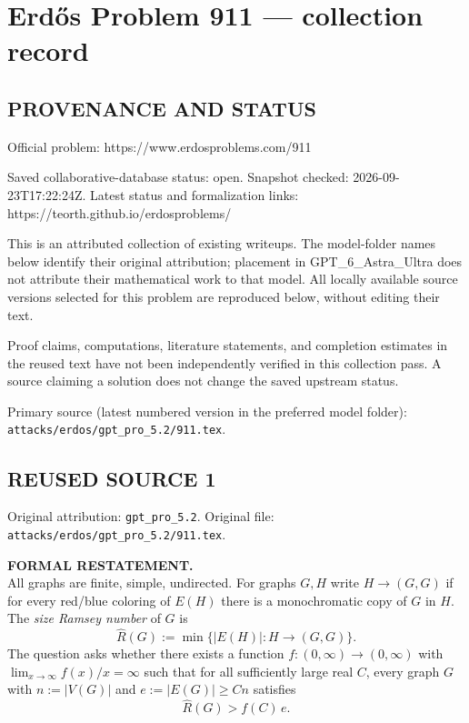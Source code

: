\section*{Erd\H{o}s Problem 911 --- collection record}

\subsection*{PROVENANCE AND STATUS}
Official problem: https://www.erdosproblems.com/911

Saved collaborative-database status: open.
Snapshot checked: 2026-09-23T17:22:24Z.
Latest status and formalization links: https://teorth.github.io/erdosproblems/

This is an attributed collection of existing writeups. The model-folder names below identify their original attribution; placement in GPT\_6\_Astra\_Ultra does not attribute their mathematical work to that model. All locally available source versions selected for this problem are reproduced below, without editing their text.

Proof claims, computations, literature statements, and completion estimates in the reused text have not been independently verified in this collection pass. A source claiming a solution does not change the saved upstream status.

Primary source (latest numbered version in the preferred model folder): \texttt{attacks/erdos/gpt\_pro\_5.2/911.tex}.

\subsection*{REUSED SOURCE 1}
Original attribution: \texttt{gpt\_pro\_5.2}.
Original file: \texttt{attacks/erdos/gpt\_pro\_5.2/911.tex}.


\noindent\textbf{FORMAL RESTATEMENT.}\\
All graphs are finite, simple, undirected. For graphs $G,H$ write $H\to (G,G)$ if for every red/blue coloring of $E(H)$ there is a monochromatic copy of $G$ in $H$. The \emph{size Ramsey number} of $G$ is
\[
\hat R(G):=\min\{|E(H)|: H\to (G,G)\}.
\]
The question asks whether there exists a function $f:(0,\infty)\to (0,\infty)$ with $\lim_{x\to\infty} f(x)/x=\infty$ such that for all sufficiently large real $C$, every graph $G$ with $n:=|V(G)|$ and $e:=|E(G)|\ge Cn$ satisfies
\[
\hat R(G) > f(C)\, e.
\]

